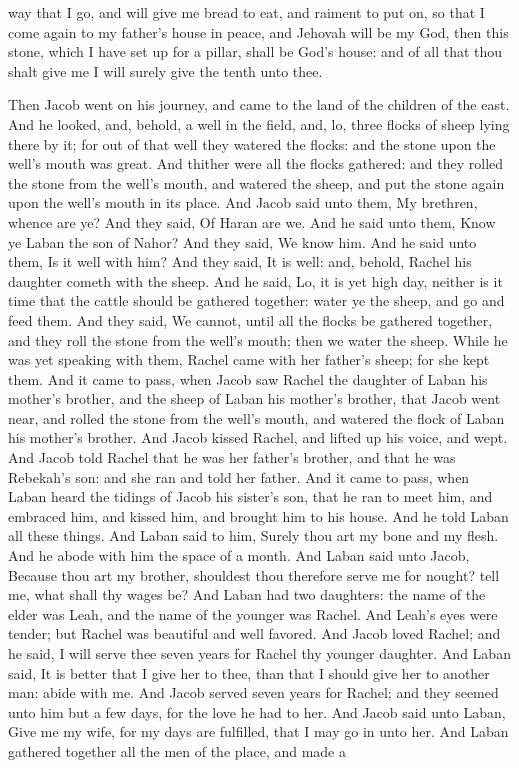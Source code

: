 way that I go, and will give me bread to eat, and raiment to put on, so that I come again to my father’s house in peace, and Jehovah will be my God, then this stone, which I have set up for a pillar, shall be God’s house: and of all that thou shalt give me I will surely give the tenth unto thee. 

Then Jacob went on his journey, and came to the land of the children of the east. And he looked, and, behold, a well in the field, and, lo, three flocks of sheep lying there by it; for out of that well they watered the flocks: and the stone upon the well’s mouth was great. And thither were all the flocks gathered: and they rolled the stone from the well’s mouth, and watered the sheep, and put the stone again upon the well’s mouth in its place. And Jacob said unto them, My brethren, whence are ye? And they said, Of Haran are we. And he said unto them, Know ye Laban the son of Nahor? And they said, We know him. And he said unto them, Is it well with him? And they said, It is well: and, behold, Rachel his daughter cometh with the sheep. And he said, Lo, it is yet high day, neither is it time that the cattle should be gathered together: water ye the sheep, and go and feed them. And they said, We cannot, until all the flocks be gathered together, and they roll the stone from the well’s mouth; then we water the sheep. While he was yet speaking with them, Rachel came with her father’s sheep; for she kept them. And it came to pass, when Jacob saw Rachel the daughter of Laban his mother’s brother, and the sheep of Laban his mother’s brother, that Jacob went near, and rolled the stone from the well’s mouth, and watered the flock of Laban his mother’s brother. And Jacob kissed Rachel, and lifted up his voice, and wept. And Jacob told Rachel that he was her father’s brother, and that he was Rebekah’s son: and she ran and told her father.  And it came to pass, when Laban heard the tidings of Jacob his sister’s son, that he ran to meet him, and embraced him, and kissed him, and brought him to his house. And he told Laban all these things. And Laban said to him, Surely thou art my bone and my flesh. And he abode with him the space of a month. And Laban said unto Jacob, Because thou art my brother, shouldest thou therefore serve me for nought? tell me, what shall thy wages be? And Laban had two daughters: the name of the elder was Leah, and the name of the younger was Rachel. And Leah’s eyes were tender; but Rachel was beautiful and well favored. And Jacob loved Rachel; and he said, I will serve thee seven years for Rachel thy younger daughter. And Laban said, It is better that I give her to thee, than that I should give her to another man: abide with me. And Jacob served seven years for Rachel; and they seemed unto him but a few days, for the love he had to her.  And Jacob said unto Laban, Give me my wife, for my days are fulfilled, that I may go in unto her. And Laban gathered together all the men of the place, and made a 